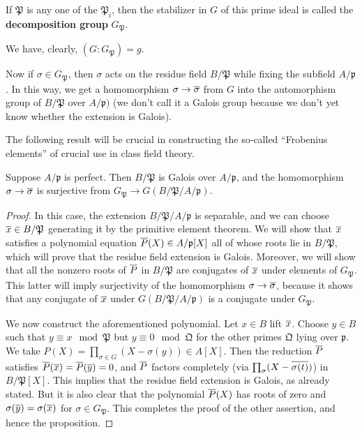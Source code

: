 \begin{definition} If $\mathfrak{P}$ is any one of the $\mathfrak{P}_i$, then the stabilizer in $G$ of this prime ideal is called the \textbf{decomposition group} $G_{\mathfrak{P}}$. \end{definition}
We have, clearly, $(G: G_{\mathfrak{P}}) = g$.

Now if $ \sigma \in G_{\mathfrak{P}}$, then $\sigma$ acts on the residue field $B/\mathfrak{P}$ while fixing the subfield $A/\mathfrak{p}$.  In this way, we get a homomorphism $\sigma \to \overline{\sigma}$ from $G$ into the automorphism group of $B/\mathfrak{P}$ over $A/\mathfrak{p})$ (we don't call it a Galois group because we don't yet know whether the extension is Galois).

The following result will be crucial in constructing the so-called ``Frobenius elements'' of crucial use in class field theory.

\begin{proposition} Suppose $A/\mathfrak{p}$ is perfect. Then $B/\mathfrak{P}$ is Galois over $A/\mathfrak{p}$, and the homomorphism $\sigma \to \overline{\sigma}$ is surjective from $G_{\mathfrak{P}} \to G(B/\mathfrak{P}/A/\mathfrak{p})$.
\end{proposition}
\begin{proof}
In this case, the extension $B/\mathfrak{P}/A/\mathfrak{p}$ is separable, and we can choose $\overline{x} \in B/\mathfrak{P}$ generating it by the primitive element theorem.  We will show that $\overline{x}$ satisfies a polynomial equation  $\overline{P}(X) \in A/\mathfrak{p}[X]$ all of whose roots lie in $B/\mathfrak{P}$, which will prove that the residue field extension is Galois.  Moreover, we will show that all the nonzero roots of $\overline{P}$ in $B/\mathfrak{P}$ are conjugates of $\overline{x}$ under elements of $G_{\mathfrak{P}}$.  This latter will imply surjectivity of the homomorphism $\sigma \to \overline{\sigma}$, because it shows that any conjugate of $\overline{x}$ under $G(B/\mathfrak{P}/A/\mathfrak{p})$ is a conjugate under $G_{\mathfrak{P}}$.

We now construct the aforementioned polynomial.   Let $x \in B$ lift $\overline{x}$.  Choose $y \in B$ such that $y \equiv x \mod \mathfrak{P}$ but $y \equiv 0 \mod \mathfrak{Q}$ for the other primes $\mathfrak{Q}$ lying over $\mathfrak{p}$.  We take $P(X) = \prod_{\sigma \in G} (X - \sigma(y)) \in A[X]$. Then the reduction $\overline{P}$ satisfies $\overline{P}(\overline{x})= \overline{P}(\overline{y}) = 0$, and $\overline{P}$ factors completely (via $\prod_{\sigma} (X - \overline{\sigma(t)})$) in $B/\mathfrak{P}[X]$.  This implies that the residue field extension is Galois, as already stated. 
But it is also clear that the polynomial $\overline{P}(X)$ has roots of zero and $\sigma(\overline{y}) = \sigma(\overline{x})$ for $\sigma \in G_{\mathfrak{P}}$.  This completes the proof of the other assertion, and hence the proposition.
\end{proof}

